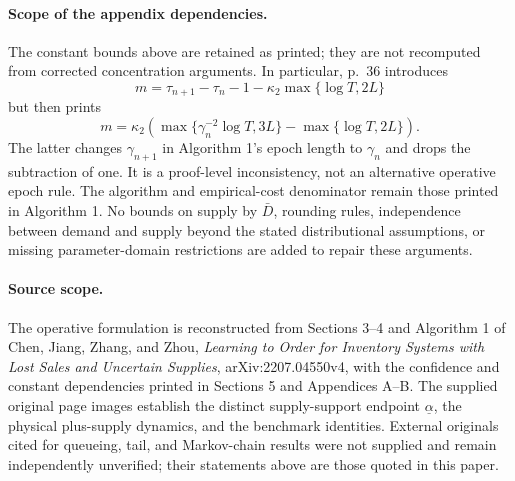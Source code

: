 \documentclass{article}
\begin{document}
\paragraph{Scope of the appendix dependencies.}
The constant bounds above are retained as printed; they are not recomputed from corrected concentration arguments. In particular, p.\ 36 introduces
\[
m=\tau_{n+1}-\tau_n-1-\kappa_2\max\{\log T,2L\}
\]
but then prints
\[
m=\kappa_2\left(
\max\{\gamma_n^{-2}\log T,3L\}-\max\{\log T,2L\}\right).
\]
The latter changes \(\gamma_{n+1}\) in Algorithm 1's epoch length to \(\gamma_n\) and drops the subtraction of one. It is a proof-level inconsistency, not an alternative operative epoch rule. The algorithm and empirical-cost denominator remain those printed in Algorithm 1. No bounds on supply by \(\bar D\), rounding rules, independence between demand and supply beyond the stated distributional assumptions, or missing parameter-domain restrictions are added to repair these arguments.

\paragraph{Source scope.}
The operative formulation is reconstructed from Sections 3--4 and Algorithm 1 of Chen, Jiang, Zhang, and Zhou, \emph{Learning to Order for Inventory Systems with Lost Sales and Uncertain Supplies}, arXiv:2207.04550v4, with the confidence and constant dependencies printed in Sections 5 and Appendices A--B. The supplied original page images establish the distinct supply-support endpoint \(\underline\alpha\), the physical plus-supply dynamics, and the benchmark identities. External originals cited for queueing, tail, and Markov-chain results were not supplied and remain independently unverified; their statements above are those quoted in this paper.
\end{document}
